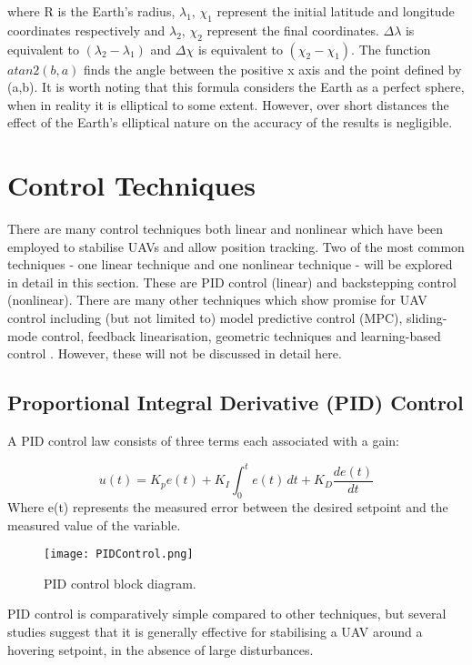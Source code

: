 where R is the Earth's radius, $\lambda_{1}$, $\chi_{1}$ represent the initial latitude and longitude coordinates respectively and $\lambda_{2}$, $\chi_{2}$ represent the final coordinates. $\Delta\lambda$ is equivalent to $(\lambda_{2}-\lambda_{1})$ and $\Delta\chi$ is equivalent to $(\chi_{2}-\chi_{1})$. The function $atan2(b,a)$ finds the angle between the positive x axis and the point defined by (a,b).
It is worth noting that this formula considers the Earth as a perfect sphere, when in reality it is elliptical to some extent. However, over short distances the effect of the Earth's elliptical nature on the accuracy of the results is negligible.


\section{Control Techniques}
There are many control techniques both linear and nonlinear which have been employed to stabilise UAVs and allow position tracking. Two of the most common techniques - one linear technique and one nonlinear technique - will be explored in detail in this section. These are PID control (linear) and backstepping control (nonlinear). There are many other techniques which show promise for UAV control including (but not limited to) model predictive control (MPC), sliding-mode control, feedback linearisation, geometric techniques and learning-based control \cite{Rubi2019}. However, these will not be discussed in detail here.  
\subsection{Proportional Integral Derivative (PID) Control}\label{section:PIDBackground}
A PID control law consists of three terms each associated with a gain:

\[u(t)=K_{p}e(t)+K_{I}\int_{0}^{t}e(t)\,dt+K_{D}\frac{de(t)}{dt}\]
Where e(t) represents the measured error between the desired setpoint and the measured value of the variable. 

\begin{figure}[htb]
	\texttt{[image: PIDControl.png]}%
	\caption{PID control block diagram.}%
	\label{fig:PIDControl}%
\end{figure}

PID control is comparatively simple compared to other techniques, but several studies suggest that it is generally effective for stabilising a UAV around a hovering setpoint, in the absence of large disturbances\cite{Bouabdallah2006}\cite{Pounds2010}\cite{Moussid2015}. \\

